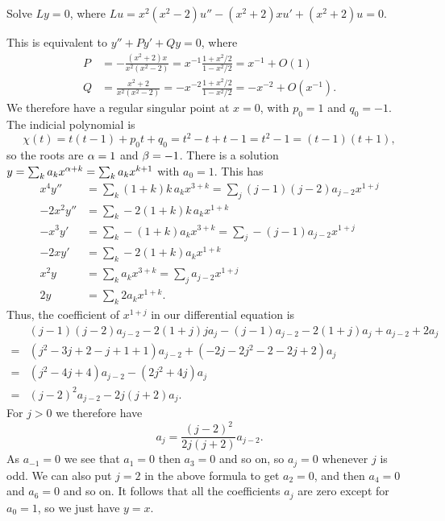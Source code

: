\documentclass[a4paper]{amsart}
\begin{document}
\begin{exercise}\label{ex-frobenius-c}
 Solve $Ly=0$, where $Lu=x^2(x^2-2)u''-(x^2+2)xu'+(x^2+2)u=0$.
\end{exercise}
\begin{solution}
 This is equivalent to $y''+Py'+Qy=0$, where
 \begin{align*}
  P &= -\frac{(x^2+2)x}{x^2(x^2-2)} = x^{-1}\frac{1+x^2/2}{1-x^2/2}
     = x^{-1} + O(1) \\
  Q &= \frac{x^2+2}{x^2(x^2-2)} = -x^{-2}\frac{1+x^2/2}{1-x^2/2}
     = -x^{-2} + O(x^{-1}). 
 \end{align*}
 We therefore have a regular singular point at $x=0$, with $p_0=1$ and
 $q_0=-1$.  The indicial polynomial is
 \[ \chi(t) = t(t-1)+p_0t+q_0 = t^2-t+t-1 = t^2-1=(t-1)(t+1), \]
 so the roots are $\alpha=1$ and $\beta=-1$.  There is a solution
 $y=\sum_ka_kx^{\alpha+k}=\sum_ka_kx^{k+1}$ with $a_0=1$.  This has
 \begin{align*}
    x^4y'' &= \sum_k (1+k)k\,a_kx^{3+k} 
            = \sum_j (j-1)(j-2)a_{j-2}x^{1+j} \\
  -2x^2y'' &= \sum_k -2(1+k)k\,a_k x^{1+k} \\
   -x^3y'  &= \sum_k -(1+k)a_kx^{3+k}
            = \sum_j -(j-1)a_{j-2}x^{1+j} \\
  -2x  y'  &= \sum_k -2(1+k)a_k x^{1+k} \\
    x^2y   &= \sum_k a_kx^{3+k} = \sum_j a_{j-2}x^{1+j} \\
      2y   &= \sum_k 2a_kx^{1+k}.
 \end{align*}
 Thus, the coefficient of $x^{1+j}$ in our differential equation is
 \begin{align*}
  & (j-1)(j-2)a_{j-2} - 2(1+j)ja_j - (j-1)a_{j-2} - 2(1+j)a_j
     + a_{j-2} + 2a_j \\
  =& (j^2-3j+2-j+1+1)a_{j-2} + (-2j-2j^2-2-2j+2)a_j \\
  =& (j^2-4j+4)a_{j-2}-(2j^2+4j)a_j \\
  =& (j-2)^2a_{j-2}-2j(j+2)a_j.
 \end{align*}
 For $j>0$ we therefore have 
 \[ a_j = \frac{(j-2)^2}{2j(j+2)}a_{j-2}. \]
 As $a_{-1}=0$ we see that $a_1=0$ then $a_3=0$ and so on, so $a_j=0$
 whenever $j$ is odd.  We can also put $j=2$ in the above formula to
 get $a_2=0$, and then $a_4=0$ and $a_6=0$ and so on.  It follows that
 all the coefficients $a_j$ are zero except for $a_0=1$, so we just
 have $y=x$.


\end{solution}
\end{document}
